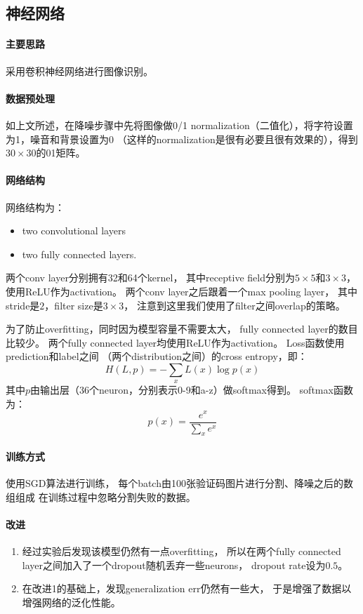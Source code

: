 \documentclass[11pt,UTF8]{article}
\begin{document}
\subsection{神经网络}
\paragraph{主要思路} 采用卷积神经网络进行图像识别。

\paragraph{数据预处理} 如上文所述，在降噪步骤中先将图像做0/1 normalization（二值化），将字符设置为1，噪音和背景设置为0
	（这样的normalization是很有必要且很有效果的），得到$30 \times 30$的01矩阵。

\paragraph{网络结构} 网络结构为：
	\begin{itemize}
	\item two convolutional layers 
	\item two fully connected layers.
	\end{itemize}

	两个conv layer分别拥有32和64个kernel，
	其中receptive field分别为$5 \times 5$和$3 \times 3$，
	使用ReLU作为activation。
	两个conv layer之后跟着一个max pooling layer，
	其中stride是$2$，filter size是$3 \times 3$，
	注意到这里我们使用了filter之间overlap的策略。

	为了防止overfitting，同时因为模型容量不需要太大，
	fully connected layer的数目比较少。
	两个fully connected layer均使用ReLU作为activation。
	Loss函数使用prediction和label之间
	（两个distribution之间）的cross entropy，即：
	$$H(L,p) = -\sum_x L(x) \log p(x)$$
	其中$p$由输出层（36个neuron，分别表示0-9和a-z）做softmax得到。
	softmax函数为：
	$$p(x) = \frac{e^x}{\sum_x e^x}$$
\paragraph{训练方式} 使用SGD算法进行训练，
	每个batch由100张验证码图片进行分割、降噪之后的数组组成
	在训练过程中忽略分割失败的数据。

\paragraph{改进}
	\begin{enumerate}
	\item 经过实验后发现该模型仍然有一点overfitting，
	所以在两个fully connected layer之间加入了一个dropout随机丢弃一些neurons，
	dropout rate设为$0.5$。
	\item 在改进1的基础上，发现generalization err仍然有一些大，
	于是增强了数据以增强网络的泛化性能。
	\end{enumerate}
\newpage
\end{document}
